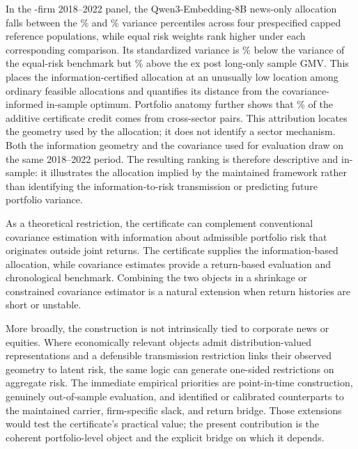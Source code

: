 In the -firm 2018--2022 panel, the
Qwen3-Embedding-8B news-only allocation
falls between the
\% and
\% variance percentiles
across four prespecified capped reference populations, while equal risk weights
rank higher under each corresponding comparison.
Its standardized variance is
\% below the variance of the
equal-risk benchmark but
\% above the ex post long-only
sample GMV.
This places the information-certified allocation at an unusually low location
among ordinary feasible allocations and quantifies its distance from the
covariance-informed in-sample optimum.
Portfolio anatomy further shows that
\% of the additive certificate credit
comes from cross-sector pairs.
This attribution locates the geometry used by the allocation; it does not
identify a sector mechanism.
Both the information geometry and the covariance used for evaluation draw on the
same 2018--2022 period.
The resulting ranking is therefore descriptive and in-sample: it illustrates
the allocation implied by the maintained framework rather than identifying the
information-to-risk transmission or predicting future portfolio variance.

As a theoretical restriction, the certificate can complement conventional
covariance estimation with information about admissible portfolio risk that
originates outside joint returns.
The certificate supplies the information-based allocation, while covariance
estimates provide a return-based evaluation and chronological benchmark.
Combining the two objects in a shrinkage or constrained covariance estimator is
a natural extension when return histories are short or unstable.

More broadly, the construction is not intrinsically tied to corporate news or
equities.
Where economically relevant objects admit distribution-valued representations
and a defensible transmission restriction links their observed geometry to
latent risk, the same logic can generate one-sided restrictions on aggregate
risk.
The immediate empirical priorities are point-in-time construction, genuinely
out-of-sample evaluation, and identified or calibrated counterparts to the
maintained carrier, firm-specific slack, and return bridge.
Those extensions would test the certificate's practical value; the present
contribution is the coherent portfolio-level object and the explicit bridge on
which it depends.
